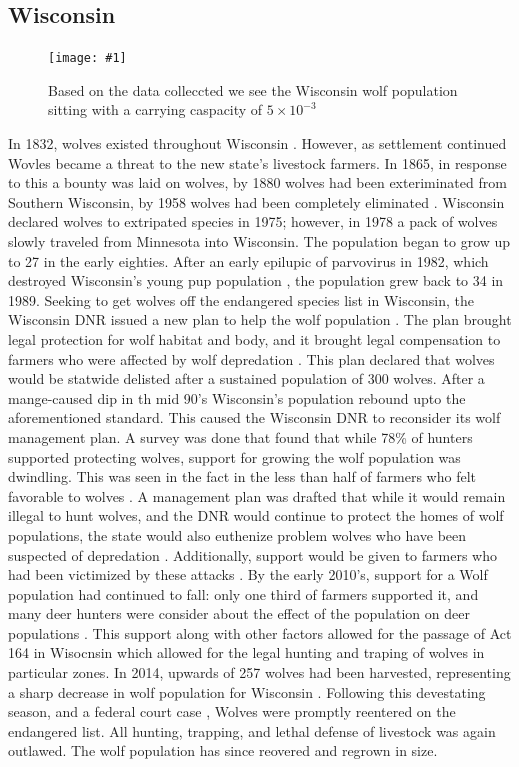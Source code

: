 \documentclass[12pt]{article}
\newcommand{\rimage}[2]{
\begin{figure}
    \begin{center}
\texttt{[image: \#1]}
\caption{#2}
    \end{center}
\end{figure}
}
\begin{document}
\subsection{Wisconsin}
\rimage{wisconsin.png}{Based on the data colleccted we see the Wisconsin wolf population sitting with a carrying caspacity of $5 \times 10^{-3}$}
In 1832, wolves existed throughout Wisconsin \cite{1999ManageWI}.
However, as settlement continued Wovles became a threat to the new state's livestock farmers.
In 1865, in response to this a bounty was laid on wolves,
    by 1880 wolves had been exteriminated from Southern Wisconsin,
    by 1958 wolves had been completely eliminated \cite{1999ManageWI}.
Wisconsin declared wolves to extripated species in 1975;
    however, in 1978 a pack of wolves slowly traveled from Minnesota into Wisconsin.
The population began to grow up to 27 in the early eighties.
After an early epilupic of parvovirus in 1982,
    which destroyed Wisconsin's young pup population \cite{2011WolvesWI},
    the population grew back to 34 in 1989.
Seeking to get wolves off the endangered species list in Wisconsin,
    the Wisconsin DNR issued a new plan to help the wolf population \cite{2011WolvesWI}.
The plan brought legal protection for wolf habitat and body,
    and it brought legal compensation to farmers who were affected by wolf depredation \cite{2011WolvesWI}.
This plan declared that wolves would be statwide delisted after a sustained population of 300 wolves.
After a mange-caused dip in th mid 90's Wisconsin's population rebound upto the aforementioned standard.
This caused the Wisconsin DNR to reconsider its wolf management plan.
A survey was done that found that while 78\% of hunters supported protecting wolves,
    support for growing the wolf population was dwindling.
This was seen in the fact in the less than half of farmers who felt favorable to wolves \cite{1999ManageWI}.
A management plan was drafted that while it would remain illegal to hunt wolves,
    and the DNR would continue to protect the homes of wolf populations,
    the state would also euthenize problem wolves who have been suspected of depredation \cite{1999ManageWI}.
Additionally, support would be given to farmers who had been victimized by these attacks \cite{1999ManageWI}.
By the early 2010's, support for a Wolf population had continued to fall:
    only one third of farmers supported it, 
    and many deer hunters were consider about the effect of the population on deer populations \cite{2014OpinionWI}.
This support along with other factors allowed for the passage of Act 164 in Wisocnsin which allowed for the legal hunting and traping
of wolves in particular zones. 
In 2014, upwards of 257 wolves had been harvested,
    representing a sharp decrease in wolf population for Wisconsin \cite{Milwauke}.
Following this devestating season,
    and a federal court case \cite{HuntingStoppedWI},
    Wolves were promptly reentered on the endangered list.
All hunting, trapping, and lethal defense of livestock was again outlawed.
The wolf population has since reovered and regrown in size.
\end{document}
